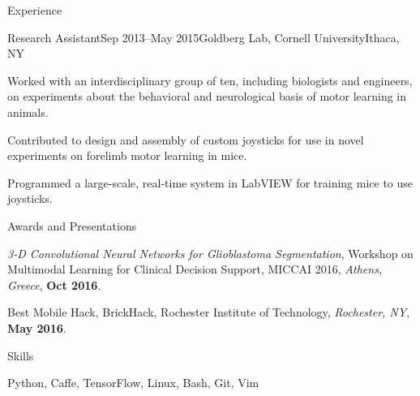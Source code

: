 \documentclass{resume}
\begin{document}
\begin{rSection}{Experience}
    \begin{rExperience}{Research Assistant}{Sep 2013--May 2015}{Goldberg Lab, Cornell University}{Ithaca, NY}
        \item Worked with an interdisciplinary group of ten, including biologists and engineers, on experiments about the behavioral and neurological basis of motor learning in animals.
        \item Contributed to design and assembly of custom joysticks for use in novel experiments on forelimb motor learning in mice.
        \item Programmed a large-scale, real-time system in LabVIEW for training mice to use joysticks.
    \end{rExperience}


\end{rSection}

\begin{rSection}{Awards and Presentations}

    {\em 3-D Convolutional Neural Networks for Glioblastoma Segmentation}, Workshop on Multimodal Learning for Clinical Decision Support, MICCAI 2016, {\em Athens, Greece}, {\bf Oct 2016}.

    Best Mobile Hack, BrickHack, Rochester Institute of Technology, {\em Rochester, NY}, {\bf May 2016}.

\end{rSection}

\begin{rSection}{Skills}

    Python, Caffe, TensorFlow, Linux, Bash, Git, Vim

\end{rSection}
\end{document}
